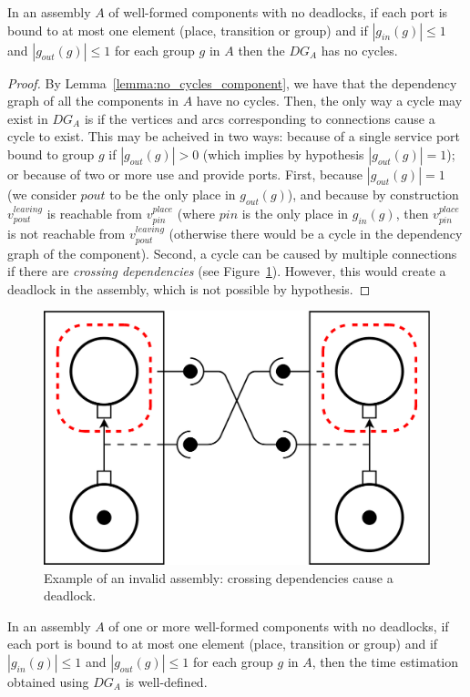 \begin{lemma}
 In an assembly $A$ of well-formed components with no deadlocks, if each port
 is bound to at most one element (place, transition or group) and if
 $\left|g_{in}(g)\right|\leq 1$ and $\left|g_{out}(g)\right|\leq 1$ for each group
 $g$ in $A$ then the $DG_A$ has no cycles.
 \label{lemma:no_cycles_assembly}
\end{lemma}

\begin{proof}
 By Lemma~\ref{lemma:no_cycles_component}, we have that the dependency graph
 of all the components in $A$ have no cycles.
 Then, the only way a cycle may exist in $DG_A$ is if the vertices and arcs
 corresponding to connections cause a cycle to exist.
 This may be acheived in two ways: because of a single service port bound to
 group $g$ if $\left|g_{out}(g)\right|>0$ (which implies by hypothesis
 $\left|g_{out}(g)\right|=1$); or because of two or more use and provide ports.
 First, because $\left|g_{out}(g)\right|=1$ (we consider $pout$ to be the only
 place in $g_{out}(g)$), and because by construction $v_{pout}^{leaving}$ is
 reachable from $v_{pin}^{place}$ (where $pin$ is the only place in $g_{in}(g)$,
 then $v_{pin}^{place}$ is not reachable from $v_{pout}^{leaving}$ (otherwise
 there would be a cycle in the dependency graph of the component). Second, a
 cycle can be caused by multiple connections if there are \emph{crossing
 dependencies} (see Figure~\ref{fig:deadlock}). However, this would create a
 deadlock in the assembly, which is not possible by hypothesis.
\end{proof}

\begin{figure}[t]
  \begin{center}
    \includegraphics[width=0.5\linewidth]{./images/deadlock.pdf}
  \end{center}
  \caption{Example of an invalid assembly: crossing dependencies cause a deadlock.}
  \label{fig:deadlock}
\end{figure}

\begin{theorem}
 In an assembly $A$ of one or more well-formed components with no deadlocks,
 if each port is bound to at most one element (place, transition or group) and if
 $\left|g_{in}(g)\right|\leq 1$ and $\left|g_{out}(g)\right|\leq 1$ for each group
 $g$ in $A$, then the time estimation obtained using $DG_A$ is well-defined.
 \label{theorem:well_defined}
\end{theorem}

